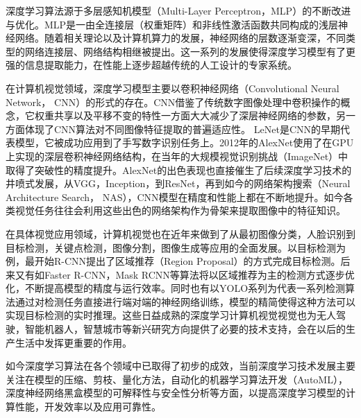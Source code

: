 深度学习算法源于多层感知机模型（Multi-Layer Perceptron，MLP）的不断改进与优化。MLP是一由全连接层（权重矩阵）和非线性激活函数共同构成的浅层神经网络。随着相关理论以及计算机算力的发展，神经网络的层数逐渐变深，不同类型的网络连接层、网络结构相继被提出。这一系列的发展使得深度学习模型有了更强的信息提取能力，在性能上逐步超越传统的人工设计的专家系统。\par
在计算机视觉领域，深度学习模型主要以卷积神经网络（Convolutional Neural Network， CNN）的形式的存在。CNN借鉴了传统数字图像处理中卷积操作的概念，它权重共享以及平移不变的特性一方面大大减少了深层神经网络的参数，另一方面体现了CNN算法对不同图像特征提取的普遍适应性。
LeNet\cite{lecun1990handwritten}是CNN的早期代表模型，它被成功应用到了手写数字识别任务上。2012年的AlexNet\cite{krizhevsky2012imagenet}使用了在GPU上实现的深层卷积神经网络结构，在当年的大规模视觉识别挑战（ImageNet\cite{deng2009imagenet}）中取得了突破性的精度提升。AlexNet的出色表现也直接催生了后续深度学习技术的井喷式发展，从VGG\cite{simonyan2014very}，Inception\cite{carranza2017going}，到ResNet\cite{he2016deep}，再到如今的网络架构搜索\cite{tan2019efficientnet}（Neural Architecture Search， NAS），CNN模型在精度和性能上都在不断地提升。如今各类视觉任务往往会利用这些出色的网络架构作为骨架来提取图像中的特征知识。\par
在具体视觉应用领域，计算机视觉也在近年来做到了从最初图像分类，人脸识别到目标检测，关键点检测，图像分割，图像生成等应用的全面发展。以目标检测为例，最开始R-CNN\cite{girshick2014rich}提出了区域推荐（Region Proposal）的方式完成目标检测。后来又有如Faster R-CNN\cite{ren2015faster}，Mask RCNN\cite{he2017mask}等算法将以区域推荐为主的检测方式逐步优化，不断提高模型的精度与运行效率。同时也有以YOLO系列为代表一系列检测算法通过对检测任务直接进行端对端的神经网络训练，模型的精简使得这种方法可以实现目标检测的实时推理。这些日益成熟的深度学习计算机视觉视觉也为无人驾驶，智能机器人，智慧城市等新兴研究方向提供了必要的技术支持，会在以后的生产生活中发挥更重要的作用。\par
如今深度学习算法在各个领域中已取得了初步的成效，当前深度学习技术发展主要关注在模型的压缩、剪枝、量化方法，自动化的机器学习算法开发（AutoML），深度神经网络黑盒模型的可解释性与安全性分析等方面，以提高深度学习模型的计算性能，开发效率以及应用可靠性。

